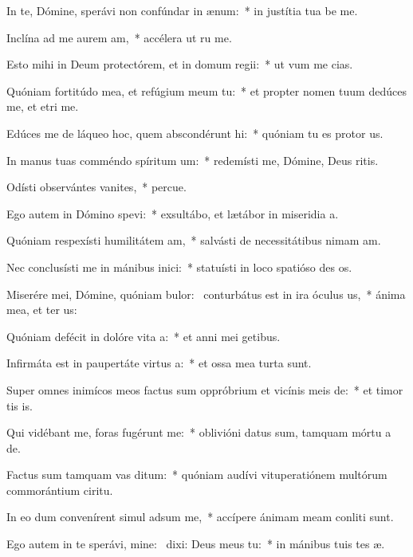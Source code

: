 \item In te, Dómine, sperávi non confúndar in ænum:~* in justítia tua be me.
\item Inclína ad me aurem am,~* accélera ut ru me.
\item Esto mihi in Deum protectórem, et in domum regii:~* ut vum me cias.
\item Quóniam fortitúdo mea, et refúgium meum  tu:~* et propter nomen tuum dedúces me, et etri me.
\item Edúces me de láqueo hoc, quem abscondérunt hi:~* quóniam tu es protor us.
\item In manus tuas comméndo spíritum um:~* redemísti me, Dómine, Deus ritis.
\item Odísti observántes vanites,~* percue.
\item Ego autem in Dómino spevi:~* exsultábo, et lætábor in miseridia a.
\item Quóniam respexísti humilitátem am,~* salvásti de necessitátibus nimam am.
\item Nec conclusísti me in mánibus inici:~* statuísti in loco spatióso des os.
\item Miserére mei, Dómine, quóniam bulor:~\pscross{} conturbátus est in ira óculus us,~* ánima mea, et ter us:
\item Quóniam defécit in dolóre vita a:~* et anni mei  getibus.
\item Infirmáta est in paupertáte virtus a:~* et ossa mea turta sunt.
\item Super omnes inimícos meos factus sum oppróbrium et vicínis meis de:~* et timor tis is.
\item Qui vidébant me, foras fugérunt  me:~* oblivióni datus sum, tamquam mórtu a de.
\item Factus sum tamquam vas ditum:~* quóniam audívi vituperatiónem multórum commorántium  ciritu.
\item In eo dum convenírent simul adsum me,~* accípere ánimam meam conliti sunt.
\item Ego autem in te sperávi, mine:~\pscross{} dixi: Deus meus  tu:~* in mánibus tuis tes æ.
